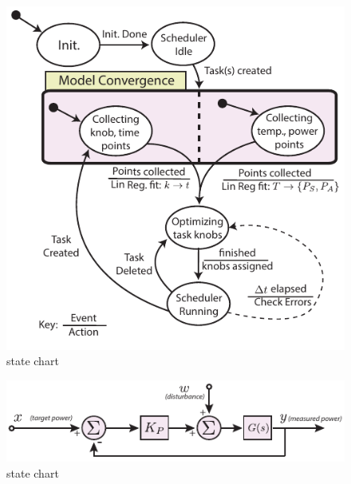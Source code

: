 \begin{figure}
\centering
\includegraphics[width=1\columnwidth]{figures/statechart.pdf}
\caption{\label{fig:state chart}state chart}
\end{figure}

\begin{figure}
\centering
\includegraphics[width=1\columnwidth]{figures/controlloop.pdf}
\caption{\label{fig:state chart}state chart}
\end{figure}




